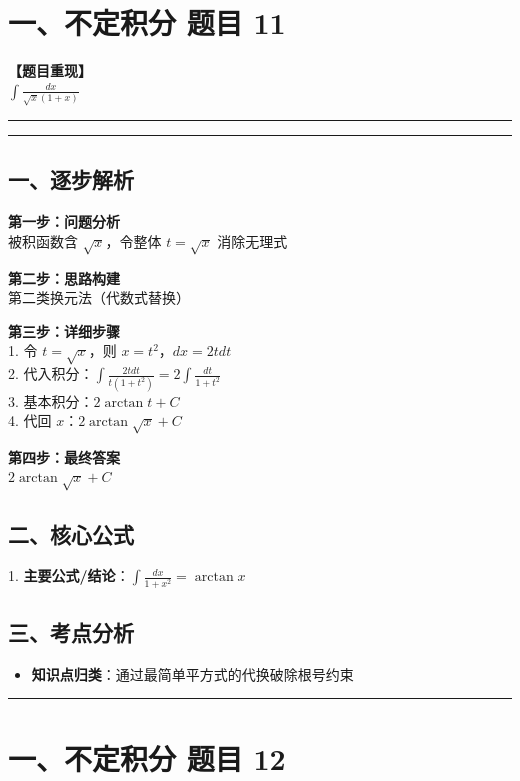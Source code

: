 ﻿\documentclass[12pt, a4paper]{ctexart}
\newcommand{\TopSeparator}{
    \par\noindent\rule{\textwidth}{1.5pt}\vspace{0.5em}
}
\newcommand{\AnalysisSeparator}{
    \par\noindent\rule{\textwidth}{0.5pt}\vspace{0.2em}\hrule\vspace{0.5em}
}
\newenvironment{RedAnalysis}{
    \par
    \color{red} 
}{
    \par
    \color{black} 
}
\begin{document}
\section*{一、不定积分 题目 11}

\textbf{【题目重现】} \\
$\int \frac{dx}{\sqrt{x}(1+x)}$

\AnalysisSeparator

\begin{RedAnalysis}

	\subsection*{一、逐步解析}

	\textbf{第一步：问题分析} \\
	被积函数含 $\sqrt{x}$，令整体 $t = \sqrt{x}$ 消除无理式

	\textbf{第二步：思路构建} \\
	第二类换元法（代数式替换）

	\textbf{第三步：详细步骤} \\
	1. 令 $t = \sqrt{x}$，则 $x = t^2$，$dx = 2t dt$ \\ 
	2. 代入积分：$\int \frac{2t dt}{t(1+t^2)} = 2 \int \frac{dt}{1+t^2}$ \\ 
	3. 基本积分：$2 \arctan t + C$ \\ 
	4. 代回 $x$：$2 \arctan \sqrt{x} + C$

	\textbf{第四步：最终答案} \\
	$2 \arctan \sqrt{x} + C$

	\subsection*{二、核心公式}
	1. \textbf{主要公式/结论}：$\int \frac{dx}{1+x^2} = \arctan x$

	\subsection*{三、考点分析}
	\begin{itemize}
		\item \textbf{知识点归类}：通过最简单平方式的代换破除根号约束
	\end{itemize}

\end{RedAnalysis}

\vspace{2em}

\TopSeparator
\section*{一、不定积分 题目 12}
\end{document}
